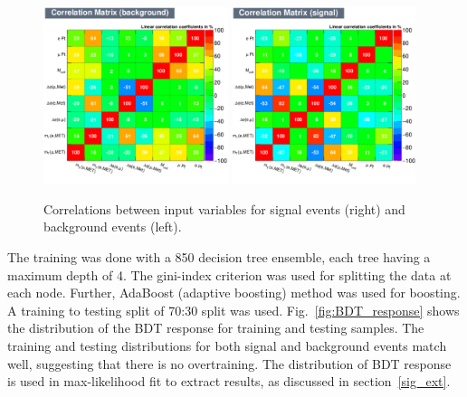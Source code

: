 \begin{figure}[htpb]
\begin{center}
\includegraphics[width=0.48\textwidth]{plots_and_figures/chapter5/CorrelationMatrixB.pdf}
\includegraphics[width=0.48\textwidth]{plots_and_figures/chapter5/CorrelationMatrixS.pdf}\\
\end{center}
\caption{ Correlations between input variables for signal events (right) and background events (left).}
\label{fig:bdt_corr_mat}
\end{figure}

The training was done with a 850 decision tree ensemble, each tree having a maximum depth of 4. The gini-index criterion was used for splitting the data at each node. Further, AdaBoost (adaptive boosting) method was used for boosting. A training to testing split of 70:30 split was used. Fig.~\ref{fig:BDT_response} shows the distribution of the BDT response for training and testing samples. The training and testing distributions for both signal and background events match well, suggesting that there is no overtraining. The distribution of BDT response is used in max-likelihood fit to extract results, as discussed in section~\ref{sig_ext}.  

